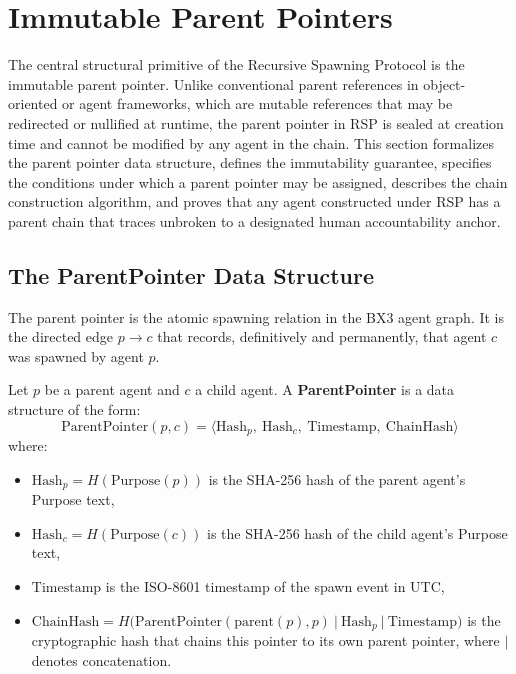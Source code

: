 \section{Immutable Parent Pointers}
\label{sec:ipp}

The central structural primitive of the Recursive Spawning Protocol is the immutable parent pointer. Unlike conventional parent references in object-oriented or agent frameworks, which are mutable references that may be redirected or nullified at runtime, the parent pointer in RSP is sealed at creation time and cannot be modified by any agent in the chain. This section formalizes the parent pointer data structure, defines the immutability guarantee, specifies the conditions under which a parent pointer may be assigned, describes the chain construction algorithm, and proves that any agent constructed under RSP has a parent chain that traces unbroken to a designated human accountability anchor.

\subsection{The ParentPointer Data Structure}

The parent pointer is the atomic spawning relation in the BX3 agent graph. It is the directed edge $p \rightarrow c$ that records, definitively and permanently, that agent $c$ was spawned by agent $p$.

\begin{definition}[ParentPointer]
\label{def:parent-pointer}
Let $p$ be a parent agent and $c$ a child agent. A \textbf{ParentPointer} is a data structure of the form:
\[
\mathrm{ParentPointer}(p, c) = \langle \mathrm{Hash}_p,\ \mathrm{Hash}_c,\ \mathrm{Timestamp},\ \mathrm{ChainHash} \rangle
\]
where:
\begin{itemize}
  \item $\mathrm{Hash}_p = H(\mathrm{Purpose}(p))$ is the SHA-256 hash of the parent agent's Purpose text,
  \item $\mathrm{Hash}_c = H(\mathrm{Purpose}(c))$ is the SHA-256 hash of the child agent's Purpose text,
  \item $\mathrm{Timestamp}$ is the ISO-8601 timestamp of the spawn event in UTC,
  \item $\mathrm{ChainHash} = H\bigl(\mathrm{ParentPointer}(\mathrm{parent}(p), p)\ \vert\ \mathrm{Hash}_p\ \vert\ \mathrm{Timestamp}\bigr)$ is the cryptographic hash that chains this pointer to its own parent pointer, where $\vert$ denotes concatenation.
\end{itemize}
\end{definition}

